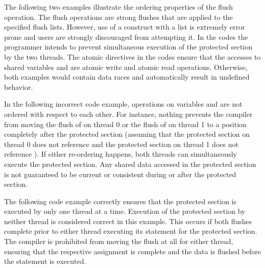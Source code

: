 


The following two examples illustrate the ordering properties of 
the flush operation. The flush operations are strong flushes 
that are applied to the specified flush lists. 
However, use of a  construct with a list is extremely error 
prone and users are strongly discouraged from attempting it. 
In the codes the programmer intends to prevent simultaneous 
execution of the protected section by the two threads.
The atomic directives in the codes ensure that the accesses to shared
variables  and  are atomic write and atomic read operations. 
Otherwise, both examples would contain data races and automatically result 
in undefined behavior.

In the following incorrect code example, operations on variables  and
 are not ordered with respect to each other. For instance, nothing
prevents the compiler from moving the flush of  on thread 0 or the
flush of  on thread 1 to a position completely after the protected
section (assuming that the protected section on thread 0 does not reference
 and the protected section on thread 1 does not reference ).
If either re-ordering happens, both threads can simultaneously execute the
protected section.
Any shared data accessed in the protected section is not guaranteed to 
be current or consistent during or after the protected section. 



The following code example correctly ensures that the protected section
is executed by only one thread at a time. Execution of the protected section
by neither thread is considered correct in this example. This occurs if both
flushes complete prior to either thread executing its  statement
for the protected section.
The compiler is prohibited from moving the flush at all for either thread,
ensuring that the respective assignment is complete and the data is flushed
before the  statement is executed.


